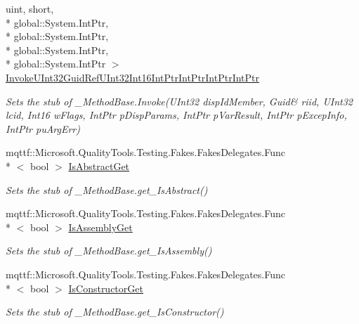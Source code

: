 \begin{DoxyCompactItemize}
uint, short, \\*
global\-::\-System.\-Int\-Ptr, \\*
global\-::\-System.\-Int\-Ptr, \\*
global\-::\-System.\-Int\-Ptr, \\*
global\-::\-System.\-Int\-Ptr $>$ \hyperlink{class_system_1_1_runtime_1_1_interop_services_1_1_fakes_1_1_stub___method_base_adf12933fea79945115c3018ffdd8ba8c}{Invoke\-U\-Int32\-Guid\-Ref\-U\-Int32\-Int16\-Int\-Ptr\-Int\-Ptr\-Int\-Ptr\-Int\-Ptr}
\begin{DoxyCompactList}\small\item\em Sets the stub of \-\_\-\-Method\-Base.\-Invoke(U\-Int32 disp\-Id\-Member, Guid\& riid, U\-Int32 lcid, Int16 w\-Flags, Int\-Ptr p\-Disp\-Params, Int\-Ptr p\-Var\-Result, Int\-Ptr p\-Excep\-Info, Int\-Ptr pu\-Arg\-Err)\end{DoxyCompactList}\item 
mqttf\-::\-Microsoft.\-Quality\-Tools.\-Testing.\-Fakes.\-Fakes\-Delegates.\-Func\\*
$<$ bool $>$ \hyperlink{class_system_1_1_runtime_1_1_interop_services_1_1_fakes_1_1_stub___method_base_a183864001f6ccb8935c670cf7b67ee17}{Is\-Abstract\-Get}
\begin{DoxyCompactList}\small\item\em Sets the stub of \-\_\-\-Method\-Base.\-get\-\_\-\-Is\-Abstract()\end{DoxyCompactList}\item 
mqttf\-::\-Microsoft.\-Quality\-Tools.\-Testing.\-Fakes.\-Fakes\-Delegates.\-Func\\*
$<$ bool $>$ \hyperlink{class_system_1_1_runtime_1_1_interop_services_1_1_fakes_1_1_stub___method_base_a070a8c2f742698d043cf59893817146e}{Is\-Assembly\-Get}
\begin{DoxyCompactList}\small\item\em Sets the stub of \-\_\-\-Method\-Base.\-get\-\_\-\-Is\-Assembly()\end{DoxyCompactList}\item 
mqttf\-::\-Microsoft.\-Quality\-Tools.\-Testing.\-Fakes.\-Fakes\-Delegates.\-Func\\*
$<$ bool $>$ \hyperlink{class_system_1_1_runtime_1_1_interop_services_1_1_fakes_1_1_stub___method_base_af6d7723dbe72a2a0eba5520d54b87289}{Is\-Constructor\-Get}
\begin{DoxyCompactList}\small\item\em Sets the stub of \-\_\-\-Method\-Base.\-get\-\_\-\-Is\-Constructor()\end{DoxyCompactList}\item 

\end{DoxyCompactItemize}
